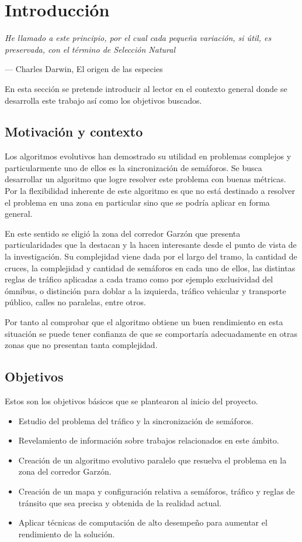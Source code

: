 \chapter{Introducción}
\epigraph{ \textit{He llamado a este principio, por el cual cada pequeña variación, si útil, es preservada, con el término de Selección Natural}}{--- Charles Darwin, El origen de las especies}

En esta sección se pretende introducir al lector en el contexto general donde se desarrolla este trabajo así como los objetivos buscados.

\section{Motivación y contexto}

Los algoritmos evolutivos han demostrado su utilidad en problemas complejos y particularmente uno de ellos es la sincronización de semáforos. Se busca desarrollar un algoritmo que logre resolver este problema con buenas métricas.
Por la flexibilidad inherente de este algoritmo es que no está destinado a resolver el problema en una zona en particular sino que se podría aplicar en forma general.

En este sentido se eligió la zona del corredor Garzón que presenta particularidades que la destacan y la hacen interesante desde el punto de vista de la investigación. Su complejidad viene dada por el largo del tramo, la cantidad de cruces, la complejidad y cantidad de semáforos en cada uno de ellos, las distintas reglas de tráfico aplicadas a cada tramo como por ejemplo exclusividad del ómnibus, o distinción para doblar a la izquierda, tráfico vehicular y transporte público, calles no paralelas, entre otros.

Por tanto al comprobar que el algoritmo obtiene un buen rendimiento en esta situación se puede tener confianza de que se comportaría adecuadamente en otras zonas que no presentan tanta complejidad.



\newpage

\section{Objetivos}

Estos son los objetivos básicos que se plantearon al inicio del  proyecto.

\begin{itemize}
	\item Estudio del problema del tráfico y la sincronización de semáforos.
	\item Revelamiento de información sobre trabajos relacionados en este ámbito.
	\item Creación de un algoritmo evolutivo paralelo que resuelva el problema en la zona del corredor Garzón.
	\item Creación de un mapa y  configuración relativa a semáforos, tráfico y reglas de tránsito que sea precisa y obtenida de la realidad actual.	
	\item Aplicar técnicas de computación de alto desempeño para aumentar el rendimiento de la solución.

\end{itemize}

